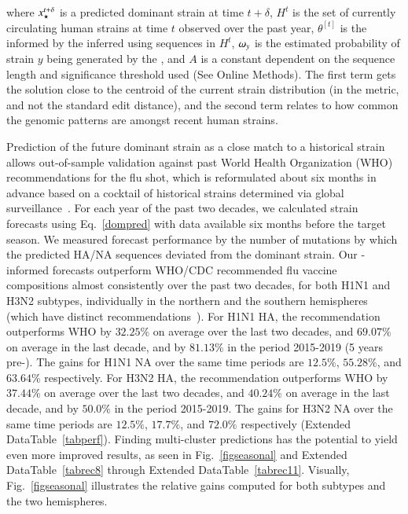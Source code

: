 \documentclass[onecolumn, compsoc,10pt]{IEEEtran}
\def\EXTENDED{Extended Data}
\def\METHODS{Online Methods\xspace}
\begin{document}
%
%
where $x_\star^{t+\delta}$ is a predicted dominant strain  at time $t+\delta$, $H^t$ is the set of currently circulating human strains at time $t$  observed over the past year, $\theta^{[t]}$ is the \qdist informed by the inferred \enet using sequences in $H^t$, $\omega_{y}$ is the estimated probability of strain $y$ being generated by the \enet, and $A$ is a constant dependent on the sequence length and significance threshold used (See \METHODS). The first term gets the solution close to the centroid of the current strain distribution (in the \qdist metric, and not the standard edit distance), and the second term relates to how common the genomic patterns are amongst recent human strains. 

Prediction of the future dominant strain as  a close match to a historical strain  allows out-of-sample validation against past World Health Organization (WHO) recommendations for the flu shot, which  is  reformulated about six months in advance based on a  cocktail of historical strains determined via global surveillance~\cite{agor2018models}. For each year of the past two decades, we calculated strain forecasts using  Eq.~\eqref{dompred} with data available six months before the target season. We  measured forecast performance by the number of mutations by which the predicted HA/NA  sequences deviated from the  dominant strain. Our \enet-informed forecasts outperform  WHO/CDC recommended flu vaccine compositions almost consistently over the past two decades, for both H1N1 and H3N2 subtypes, individually in the northern and the southern hemispheres (which have distinct recommendations~\cite{boni2008vaccination}). For H1N1 HA, the \enet  recommendation outperforms  WHO  by $32.25\%$ on average over the last two decades, and $69.07\%$ on average in the last decade, and by $81.13\%$ in the period 2015-2019 (5 years pre-\cov). The gains for H1N1 NA over the same time periods are $12.5\%$, $55.28\%$, and $63.64\%$ respectively. For H3N2 HA, the \enet  recommendation outperforms  WHO  by $37.44\%$ on average over the last two decades, and $40.24\%$ on average in the last decade, and by $50.0\%$ in the period 2015-2019. The gains for H3N2 NA over the same time periods are $12.5\%$, $17.7\%$, and $72.0\%$ respectively (\EXTENDED Table~\ref{tabperf}).
Finding multi-cluster predictions has the potential to yield even more improved results, as seen in Fig.~\ref{figseasonal} and \EXTENDED Table~\ref{tabrec8} through \EXTENDED Table~\ref{tabrec11}.
Visually, Fig.~\ref{figseasonal} illustrates the relative gains computed for both subtypes and the two hemispheres.
\end{document}
